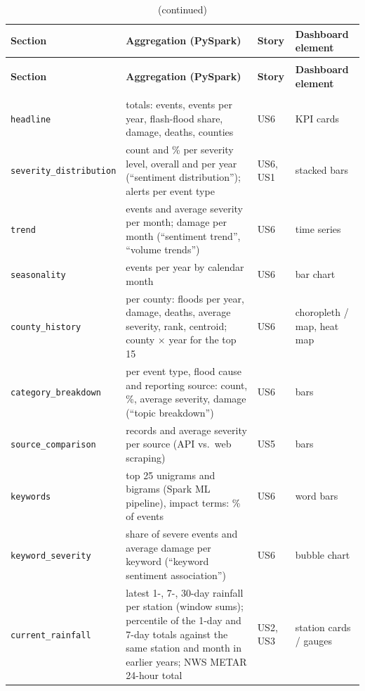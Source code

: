 \documentclass[stu, 12pt, letterpaper, donotrepeattitle, floatsintext, natbib]{apa7}
\begin{document}
{\scriptsize
\begin{xltabular}{\textwidth}{>{\raggedright\arraybackslash}p{2.7cm} >{\raggedright\arraybackslash}X >{\raggedright\arraybackslash}p{1.0cm} >{\raggedright\arraybackslash}p{3.0cm}}
\caption{Storytelling sections: aggregation, user story and dashboard element.}\label{tab:sections}\\
\toprule
\textbf{Section} & \textbf{Aggregation (PySpark)} & \textbf{Story} & \textbf{Dashboard element} \\
\midrule
\endfirsthead
\caption[]{(continued)}\\
\toprule
\textbf{Section} & \textbf{Aggregation (PySpark)} & \textbf{Story} & \textbf{Dashboard element} \\
\midrule
\endhead
\midrule{}\\
\endfoot
\bottomrule
\endlastfoot
\texttt{headline} & totals: events, events per year, flash-flood share, damage, deaths, counties & US6 & KPI cards \\
\texttt{severity\_distribution} & count and \% per severity level, overall and per year (``sentiment distribution''); alerts per event type & US6, US1 & stacked bars \\
\texttt{trend} & events and average severity per month; damage per month (``sentiment trend'', ``volume trends'') & US6 & time series \\
\texttt{seasonality} & events per year by calendar month & US6 & bar chart \\
\texttt{county\_history} & per county: floods per year, damage, deaths, average severity, rank, centroid; county $\times$ year for the top 15 & US6 & choropleth / map, heat map \\
\texttt{category\_breakdown} & per event type, flood cause and reporting source: count, \%, average severity, damage (``topic breakdown'') & US6 & bars \\
\texttt{source\_comparison} & records and average severity per source (API vs.\ web scraping) & US5 & bars \\
\texttt{keywords} & top 25 unigrams and bigrams (Spark ML pipeline), impact terms: \% of events & US6 & word bars \\
\texttt{keyword\_severity} & share of severe events and average damage per keyword (``keyword sentiment association'') & US6 & bubble chart \\
\texttt{current\_rainfall} & latest 1-, 7-, 30-day rainfall per station (window sums); percentile of the 1-day and 7-day totals against the same station and month in earlier years; NWS METAR 24-hour total & US2, US3 & station cards / gauges \\

\end{xltabular}}
\end{document}
